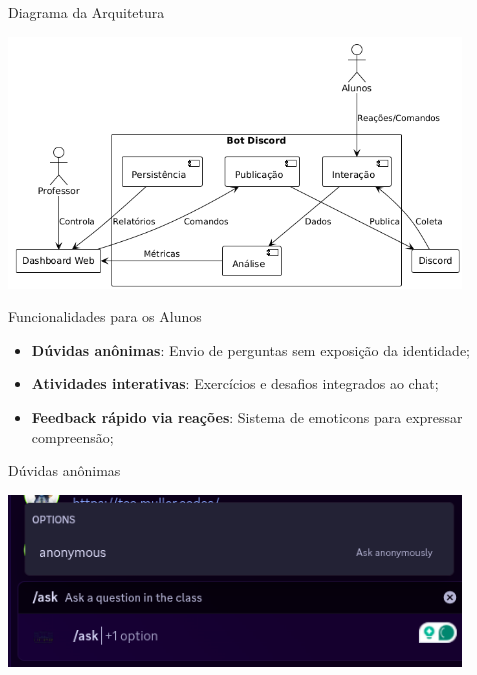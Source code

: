 \documentclass[aspectratio=169]{beamer}
\begin{document}
{\begin{frame}{Diagrama da Arquitetura}
  \begin{center}
    \includegraphics[width=0.9\textwidth]{arquitetura-bot.png}
  \end{center}
\end{frame}

\begin{frame}{Funcionalidades para os Alunos}
  \begin{itemize}
  \item \textbf{Dúvidas anônimas}: Envio de perguntas sem exposição da identidade;
  \item \textbf{Atividades interativas}: Exercícios e desafios integrados ao chat;
  \item \textbf{Feedback rápido via reações}: Sistema de emoticons para expressar compreensão;
  \end{itemize}
\end{frame}

\begin{frame}{Dúvidas anônimas}
  \begin{center}
    \includegraphics[width=0.9\textwidth]{func-alunos/2.png}
  \end{center}
\end{frame}

}
\end{document}
